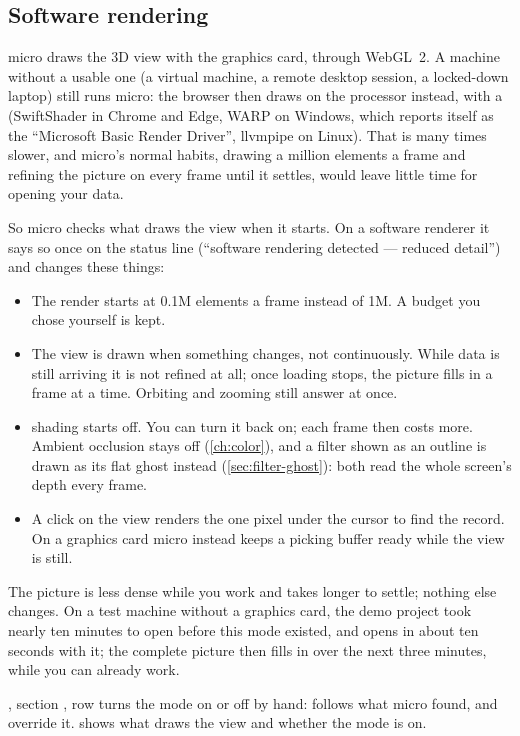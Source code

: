 \subsection{Software rendering}\label{sec:start-software}
micro draws the 3D view with the graphics card, through WebGL~2. A machine without a usable one (a virtual machine, a remote desktop session, a locked-down laptop) still runs micro: the browser then draws on the processor instead, with a  (SwiftShader in Chrome and Edge, WARP on Windows, which reports itself as the \enquote{Microsoft Basic Render Driver}, llvmpipe on Linux). That is many times slower, and micro's normal habits, drawing a million elements a frame and refining the picture on every frame until it settles, would leave little time for opening your data.

So micro checks what draws the view when it starts. On a software renderer it says so once on the status line (\enquote{software rendering detected — reduced detail}) and changes these things:
\begin{itemize}
\item The render  starts at 0.1M elements a frame instead of 1M. A budget you chose yourself is kept.
\item The view is drawn when something changes, not continuously. While data is still arriving it is not refined at all; once loading stops, the picture fills in a frame at a time. Orbiting and zooming still answer at once.
\item {} shading starts off. You can turn it back on; each frame then costs more. Ambient occlusion stays off (\cref{ch:color}), and a filter shown as an outline is drawn as its flat ghost instead (\cref{sec:filter-ghost}): both read the whole screen's depth every frame.
\item A click on the view renders the one pixel under the cursor to find the record. On a graphics card micro instead keeps a picking buffer ready while the view is still.
\end{itemize}
The picture is less dense while you work and takes longer to settle; nothing else changes. On a test machine without a graphics card, the demo project took nearly ten minutes to open before this mode existed, and opens in about ten seconds with it; the complete picture then fills in over the next three minutes, while you can already work.

, section , row  turns the mode on or off by hand:  follows what micro found,  and  override it.  shows what draws the view and whether the mode is on.

